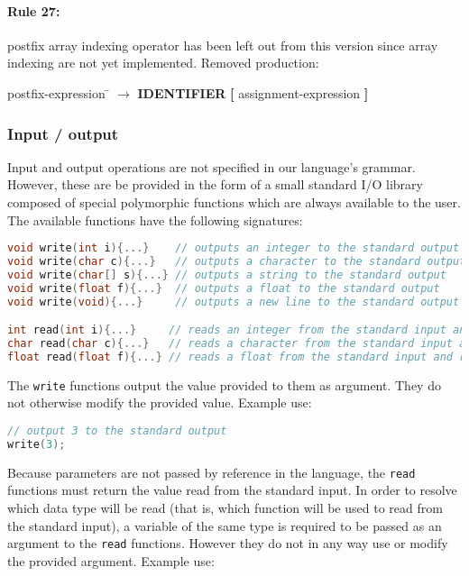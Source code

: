 \paragraph{Rule 27:} postfix array indexing operator has been left out from this version since
array indexing are not yet implemented. Removed production:

\begin{tabbing} postfix-expression \= $\rightarrow$ \= \textbf{IDENTIFIER} \textbf{[} assignment-expression \textbf{]} \end{tabbing}

\subsubsection{Input / output}
Input and output operations are not specified in our language's grammar. However, these are be provided
in the form of a small standard I/O library composed of special polymorphic functions which are always
available to the user. The available functions have the following signatures:

\begin{lstlisting}[language=C]
void write(int i){...}    // outputs an integer to the standard output
void write(char c){...}   // outputs a character to the standard output
void write(char[] s){...} // outputs a string to the standard output
void write(float f){...}  // outputs a float to the standard output
void write(void){...}     // outputs a new line to the standard output

int read(int i){...}     // reads an integer from the standard input and returns it
char read(char c){...}   // reads a character from the standard input and returns it
float read(float f){...} // reads a float from the standard input and returns it
\end{lstlisting}

The \texttt{write} functions output the value provided to them as argument. They do not
otherwise modify the provided value. Example use:

\begin{lstlisting}[language=C]
// output 3 to the standard output
write(3);
\end{lstlisting}

Because parameters are not passed by reference in the language, the \texttt{read} functions
must return the value read from the standard input. In order to resolve which data type
will be read (that is, which function will be used to read from the standard input), a
variable of the same type is required to be passed as an argument to the \texttt{read}
functions. However they do not in any way use or modify the provided argument. Example use:

